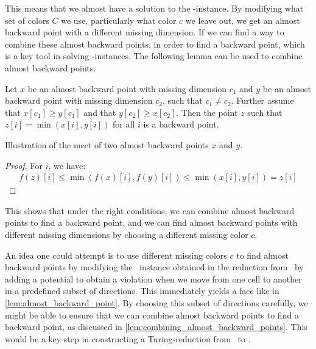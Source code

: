 This means that we almost have a solution to the \Tarskistar-instance. By modifying what set of colors $C$ we use, particularly what color $c$ we leave out, we get an almost backward point with a different missing dimension. If we can find a way to combine these almost backward points, in order to find a backward point, which is a key tool in solving \Tarski-instances. The following lemma can be used to combine almost backward points.
\begin{lemma}\label{lem:combining_almost_backward_points}
	Let $x$ be an almost backward point with missing dimension $c_1$ and $y$ be an almost backward point with missing dimension $c_2$, such that $c_1 \neq c_2$. Further assume that $x[c_1] \geq y[c_1]$ and that $y[c_2] \geq x[c_2]$. Then the point $z$ such that $z[i] = \min(x[i], y[i])$ for all $i$ is a backward point.
\end{lemma}
\begin{marginfigure}[-25mm]
	\centering
	\caption{Illustration of the meet of two almost backward points $x$ and $y$.}\label{fig:example_almost_backwards}
\end{marginfigure}
\begin{proof}
	For $i$, we have:
	\begin{align*}
		f(z)[i] \leq \min(f(x)[i], f(y)[i]) \leq \min(x[i], y[i]) = z[i]
	\end{align*}
\end{proof}
This shows that under the right conditions, we can combine almost backward points to find a backward point, and we can find almost backward points with different missing dimensions by choosing a different missing color $c$.

An idea one could attempt is to use different missing colors $c$ to find almost backward points by modifying the \EndOfLine\ instance obtained in the reduction from \Tarskistar\ by adding a potential to obtain a violation when we move from one cell to another in a predefined subset of directions. This immediately yields a face like in \cref{lem:almost_backward_point}. By choosing this subset of directions carefully, we might be able to ensure that we can combine almost backward points to find a backward point, as discussed in \cref{lem:combining_almost_backward_points}. This would be a key step in constructing a Turing-reduction from \Tarskistar\ to \EndOfPotentialLine\@.

